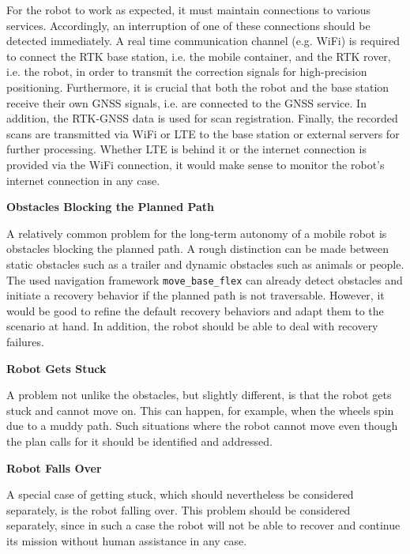 \documentclass[english, master, utf8]{base/thesis_KBS}
\newcommand{\code}[1]{\colorbox{light-gray}{\texttt{#1}}}
\begin{document}
\noindent
For the robot to work as expected, it must maintain connections to various services. Accordingly, an interruption of one of these connections should be detected immediately.
A real time communication channel (e.g. WiFi) is required to connect the RTK base station, i.e. the mobile container, and the RTK rover, i.e. the robot, in order to
transmit the correction signals for high-precision positioning. Furthermore, it is crucial that both the robot and the base station receive their own GNSS signals,
i.e. are connected to the GNSS service. In addition, the RTK-GNSS data is used for scan registration. Finally, the recorded scans are transmitted via WiFi or LTE 
to the base station or external servers for further processing. Whether LTE is behind it or the internet connection is provided via the WiFi connection, it would make sense
to monitor the robot's internet connection in any case.\newline

\noindent
\textbf{Obstacles Blocking the Planned Path}\newline

\noindent
A relatively common problem for the long-term autonomy of a mobile robot is obstacles blocking the planned path.
A rough distinction can be made between static obstacles such as a trailer and dynamic obstacles such as animals or people.
The used navigation framework \code{move\_base\_flex} can already detect obstacles and initiate a recovery behavior if the planned path is not traversable.
However, it would be good to refine the default recovery behaviors and adapt them to the scenario at hand. In addition, the robot should be able to deal with
recovery failures.\newline

\noindent
\textbf{Robot Gets Stuck}\newline

\noindent
A problem not unlike the obstacles, but slightly different, is that the robot gets stuck and cannot move on. This can happen, for example, when the wheels spin due 
to a muddy path. Such situations where the robot cannot move even though the plan calls for it should be identified and addressed.\newline

\noindent
\textbf{Robot Falls Over}\newline

\noindent
A special case of getting stuck, which should nevertheless be considered separately, is the robot falling over.
This problem should be considered separately, since in such a case the robot will not be able to recover and continue its mission without human assistance in any case.\newline
\end{document}
